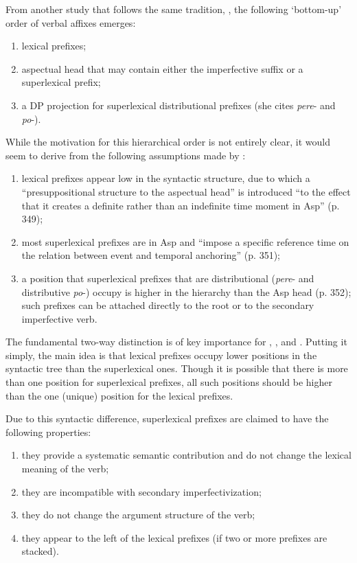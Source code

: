 From another study that follows the same tradition, \citealt{Ramchand:04}, the following `bottom-up' order of verbal affixes emerges:

\begin{enumerate}
\item lexical prefixes;
\item aspectual head that may contain either the imperfective suffix or a superlexical prefix;
\item a DP projection for superlexical distributional prefixes (she cites \textit{pere}- and \textit{po}-). 
\end{enumerate}
While the motivation for this hierarchical order is not entirely clear, it would seem to derive from the following assumptions made by \citet{Ramchand:04}: 
\begin{enumerate}
\item lexical prefixes appear low in the syntactic structure, due to which a ``presuppositional structure to the aspectual head'' is introduced ``to the effect that it creates a definite rather than an indefinite time moment in Asp'' (p. 349);
\item most superlexical prefixes are in Asp and ``impose a specific reference time on the relation between event and temporal anchoring'' (p. 351);
\item a position that superlexical prefixes that are distributional (\textit{pere}- and distributive \textit{po}-) occupy is higher in the hierarchy than the Asp head (p. 352); such prefixes can be attached directly to the root or to the secondary imperfective verb.
\end{enumerate}
The fundamental two-way distinction is of key importance for \citet{Romanova:04}, \citet{Svenonius:04b}, and \citet{Ramchand:04}. Putting it simply, the main idea is that lexical prefixes occupy lower positions in the syntactic tree than the superlexical ones. Though it is possible that there is more than one position for superlexical prefixes, all such positions should be higher than the one (unique) position for the lexical prefixes. 

Due to this syntactic difference, superlexical prefixes are claimed to have the following properties:
\begin{enumerate}
\item they provide a systematic semantic contribution and do not change the lexical meaning of the verb;
\item they are incompatible with secondary imperfectivization;
\item they do not change the argument structure of the verb;
\item they appear to the left of the lexical prefixes (if two or more prefixes are stacked). 
\end{enumerate}

